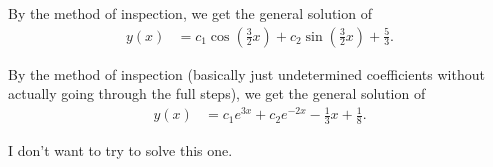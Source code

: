 \documentclass[10pt]{mypackage}
\begin{document}
\RaggedRight
\begin{solution}[4.4, Problem 2]
  By the method of inspection, we get the general solution of
  \begin{align*}
    y(x) &= c_1\cos\left( \frac{3}{2}x \right) + c_2\sin\left( \frac{3}{2}x \right) + \frac{5}{3}.
  \end{align*}
\end{solution}
\begin{solution}[4.4, Problem 4]
  By the method of inspection (basically just undetermined coefficients without actually going through the full steps), we get the general solution of
  \begin{align*}
    y(x) &= c_1e^{3x} + c_2 e^{-2x} - \frac{1}{3}x + \frac{1}{8}.
  \end{align*}
\end{solution}
\begin{solution}[4.4, Problem 12]
  I don't want to try to solve this one.
\end{solution}
\begin{solution}[4.6, Problem 2]

\end{solution}
\begin{solution}[4.6, Problem 8]

\end{solution}
\begin{solution}[4.6, Problem 14]

\end{solution}
\begin{solution}[4.6, Problem 31]

\end{solution}
\begin{solution}[4.7, Problem 4]

\end{solution}
\begin{solution}[4.7, Problem 10]

\end{solution}
\begin{solution}[4.7, Problem 12]

\end{solution}
\begin{solution}[4.7, Problem 14]

\end{solution}
\begin{solution}[4.7, Problem 16]

\end{solution}
\begin{solution}[4.7, Problem 18]

\end{solution}
\begin{solution}[4.7, Problem 32]

\end{solution}
\end{document}

